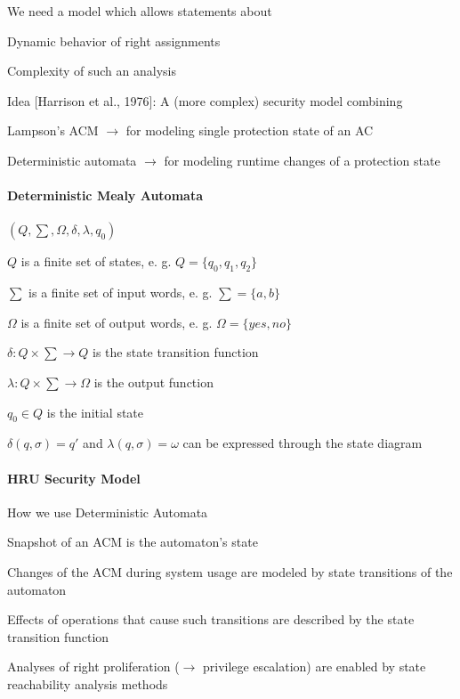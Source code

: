 \documentclass[a4paper]{article}
\begin{document}
\begin{multicols}{3}
    We need a model which allows statements about
    \begin{itemize*}
        \item Dynamic behavior of right assignments
        \item Complexity of such an analysis
    \end{itemize*}

    Idea [Harrison et al., 1976]: A (more complex) security model combining
    \begin{itemize*}
        \item Lampson’s ACM $\rightarrow$ for modeling single protection state of an AC
        \item Deterministic automata $\rightarrow$ for modeling runtime changes of a protection state
    \end{itemize*}

    \paragraph{Deterministic Mealy Automata}
    $(Q,\sum,\Omega,\delta,\lambda,q_0)$
    \begin{itemize*}
        \item $Q$ is a finite set of states, e. g. $Q=\{q_0 ,q_1 ,q_2\}$
        \item $\sum$ is a finite set of input words, e. g. $\sum=\{a,b\}$
        \item $\Omega$ is a finite set of output words, e. g. $\Omega=\{yes,no\}$
        \item $\delta:Q\times\sum\rightarrow Q$ is the state transition function
        \item $\lambda:Q\times\sum\rightarrow\Omega$ is the output function
        \item $q_0\in Q$ is the initial state
        \item $\delta(q,\sigma)=q'$ and $\lambda(q,\sigma)=\omega$ can be expressed through the state diagram
    \end{itemize*}

    \paragraph{HRU Security Model}
    How we use Deterministic Automata
    \begin{itemize*}
        \item Snapshot of an ACM is the automaton’s state
        \item Changes of the ACM during system usage are modeled by state transitions of the automaton
        \item Effects of operations that cause such transitions are described by the state transition function
        \item Analyses of right proliferation ($\rightarrow$ privilege escalation) are enabled by state reachability analysis methods
    \end{itemize*}


\end{multicols}
\end{document}
